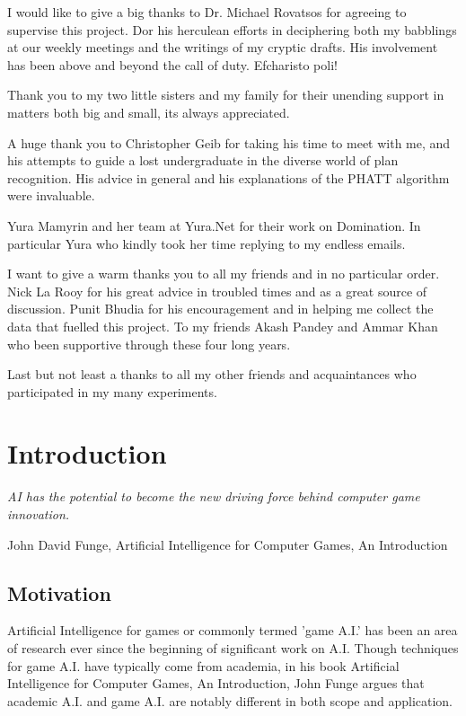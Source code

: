 \documentclass[parskip]{cs4rep}
\begin{document}
I would like to give a big thanks to Dr. Michael Rovatsos for agreeing to supervise this project. Dor his herculean efforts in deciphering both my babblings at our weekly meetings and the writings of my cryptic drafts. His involvement has been above and beyond the call of duty. Efcharisto poli!

Thank you to my two little sisters and my family for their unending support in matters both big and small, its always appreciated. 

A huge thank you to Christopher Geib for taking his time to meet with me, and his attempts to guide a lost undergraduate in the diverse world of plan recognition. His advice in general and his explanations of the PHATT algorithm were invaluable. 

Yura Mamyrin and her team at Yura.Net for their work on Domination. In particular Yura who kindly took her time replying to my endless emails.

I want to give a warm thanks you to all my friends and in no particular order. Nick La Rooy for his great advice in troubled times and as a great source of discussion. Punit Bhudia for his encouragement and in helping me collect the data that fuelled this project. To my friends Akash Pandey and Ammar Khan who been supportive through these four long years. 

Last but not least a thanks to all my other friends and acquaintances who participated in my many experiments.

\tableofcontents


\chapter{Introduction}

\begin{flushleft}
\textit{AI has the potential to become the new driving force behind computer game innovation.}
\end{flushleft}
\begin{flushleft}
John David Funge, Artificial Intelligence for Computer Games, An Introduction
\end{flushleft}

\section{Motivation}

Artificial Intelligence for games or commonly termed 'game A.I.' has been an area of research ever since the beginning of significant work on A.I. Though techniques for game A.I. have typically come from academia, in his book Artificial Intelligence for Computer Games, An Introduction, John Funge argues \cite{JohnFunge:AIForComp} that academic A.I. and game A.I. are notably different in both scope and application.
\end{document}
